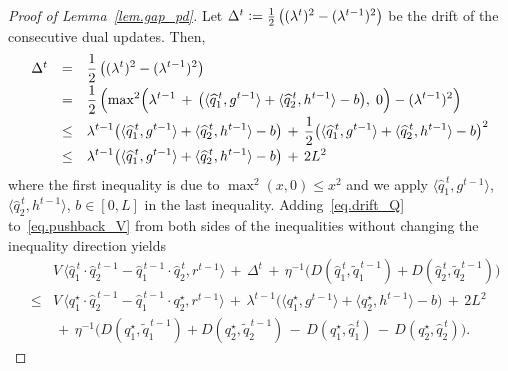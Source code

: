 \documentclass[12pt, final]{l4dc2023}
\begin{document}
\begin{proof}[Proof of Lemma~\ref{lem.gap_pd}]
	Let $\Delta^t\mathrel{\mathop:}= \frac{1}{2} \left((\lambda^{t})^2-(\lambda^{t-1})^2\right)$ be the drift of the consecutive dual updates. Then,
	\begin{equation}\label{eq.drift_Q}
	\begin{array}{rcl}
	\Delta^t &=& \displaystyle 
	\frac{1}{2}\left( ( \lambda^{t} )^2 - ( \lambda^{t-1} )^2 \right)
	\\[0.2cm]
	&=& \displaystyle 
	\frac{1}{2}\left( \max\!^2 \Big( \lambda^{t-1} \,+\, \big( \langle{\widehat q_1^{\,t}},{g^{t-1}}\rangle+\langle{\widehat q_2^{\,t}},{h^{t-1}}\rangle-b \big),\; 0 \Big) - ( \lambda^{t-1} )^2 \right)
	\\[0.2cm]
	&\leq& \displaystyle 
	\lambda^{t-1}\big( \langle{\widehat q_1^{\,t}},{g^{t-1}}\rangle+\langle{\widehat q_2^{\,t}},{h^{t-1}}\rangle-b \big) \,+\, \frac{1}{2}\big( \langle{\widehat q_1^{\,t}},{g^{t-1}}\rangle+\langle{\widehat q_2^{\,t}},{h^{t-1}}\rangle-b \big)^2
	\\[0.2cm]
	&\leq& \displaystyle 
	\lambda^{t-1}\big( \langle{\widehat q_1^{\,t}},{g^{t-1}}\rangle+\langle{\widehat q_2^{\,t}},{h^{t-1}}\rangle-b \big) \,+\, 2L^2
	\end{array}
	\end{equation}
	where the first inequality is due to $\max^2(x,0)\leq x^2$ and we apply $\langle{\hat q_1^{\,t}},{g^{t-1}}\rangle$, $\langle{\hat q_2^{\,t}},{h^{t-1}}\rangle$, $b\in [0,L]$ in the last inequality.
	Adding~\eqref{eq.drift_Q} to~\eqref{eq.pushback_V} from both sides of the inequalities without changing the inequality direction yields
	\begin{equation}\label{eq.pushback_VQ}
	\begin{array}{rcl}
	&& \!\!\!\! \!\!\!\! \!\! 
	V\, \big\langle{\hat q_1^{\,t}\cdot \hat q_2^{\,t-1}- \hat q_1^{\,t-1}\cdot \hat q_2^{\,t}},{r^{t-1}}\big\rangle 
	\,+\,
	\Delta^{t} 
	\,+\, \eta^{-1} \big(D(\hat q_1^{\,t},\tilde q_1^{\,t-1}) + D(\hat q_2^{\,t}, \tilde q_2^{\,t-1})\big)
	\\[0.2cm]
	&\leq& V\, \big\langle{ q_1^\star\cdot \hat q_2^{\,t-1}-\hat q_1^{\,t-1}\cdot  q_2^\star },{r^{t-1}}\big\rangle 
	\,+\,
	\lambda^{t-1} \big(\langle{ q_1^\star},{g^{t-1}}\rangle 
	+ \langle{ q_2^\star},{h^{t-1}}\rangle -b\big)
	\,+\,2L^2
	\\[0.2cm]
	&& \,+\, \eta^{-1} \big(D( q_1^\star,\tilde q_1^{\,t-1}) + D( q_2^\star, \tilde q_2^{\,t-1}) \,-\, D( q_1^\star,\hat q_1^{\,t}) \,-\, D( q_2^\star, \hat q_2^{\,t}) \big).
	\end{array}
	\end{equation}

\end{proof}
\end{document}
